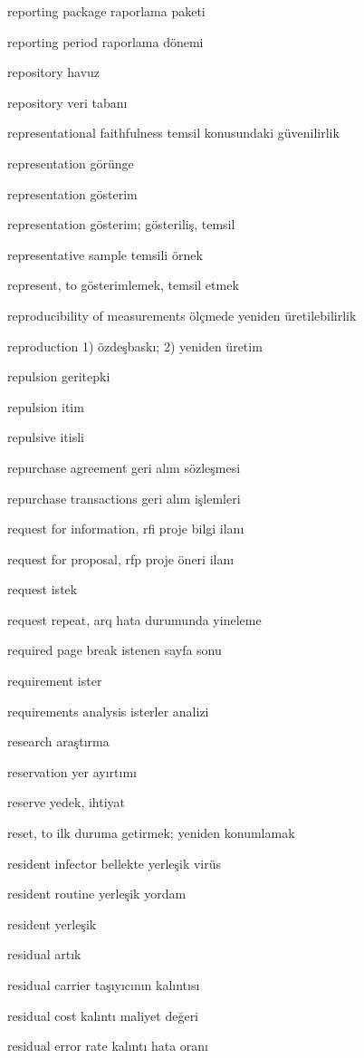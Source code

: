 \documentclass[12pt,fleqn]{article}\usepackage{../../common}
\begin{document}
reporting package raporlama paketi

reporting period raporlama dönemi

repository havuz

repository veri tabanı

representational faithfulness temsil konusundaki güvenilirlik

representation görünge

representation gösterim

representation gösterim; gösteriliş, temsil

representative sample temsili örnek

represent, to gösterimlemek, temsil etmek

reproducibility of measurements ölçmede yeniden üretilebilirlik

reproduction 1) özdeşbaskı; 2) yeniden üretim

repulsion geritepki

repulsion itim

repulsive itisli

repurchase agreement geri alım sözleşmesi

repurchase transactions geri alım işlemleri

request for information, rfi proje bilgi ilanı

request for proposal, rfp proje öneri ilanı

request istek

request repeat, arq hata durumunda yineleme

required page break istenen sayfa sonu

requirement ister

requirements analysis isterler analizi

research araştırma

reservation yer ayırtımı

reserve yedek, ihtiyat

reset, to ilk duruma getirmek; yeniden konumlamak

resident infector bellekte yerleşik virüs

resident routine yerleşik yordam

resident yerleşik

residual artık

residual carrier taşıyıcının kalıntısı

residual cost kalıntı maliyet değeri

residual error rate kalıntı hata oranı
\end{document}
